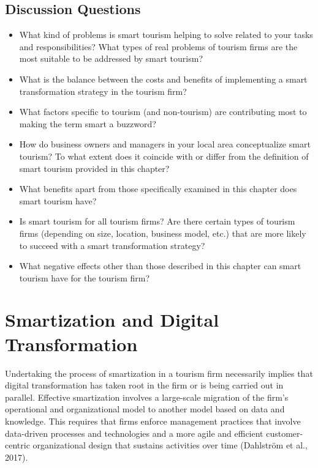 \documentclass[
  letterpaper,
  DIV=11,
  numbers=noendperiod]{scrreprt}
\begin{document}
\hypertarget{discussion-questions}{%
\section{Discussion Questions}\label{discussion-questions}}

\begin{itemize}
\item
  What kind of problems is smart tourism helping to solve related to
  your tasks and responsibilities? What types of real problems of
  tourism firms are the most suitable to be addressed by smart tourism?
\item
  What is the balance between the costs and benefits of implementing a
  smart transformation strategy in the tourism firm?
\item
  What factors specific to tourism (and non-tourism) are contributing
  most to making the term smart a buzzword?
\item
  How do business owners and managers in your local area conceptualize
  smart tourism? To what extent does it coincide with or differ from the
  definition of smart tourism provided in this chapter?
\item
  What benefits apart from those specifically examined in this chapter
  does smart tourism have?
\item
  Is smart tourism for all tourism firms? Are there certain types of
  tourism firms (depending on size, location, business model, etc.) that
  are more likely to succeed with a smart transformation strategy?
\item
  What negative effects other than those described in this chapter can
  smart tourism have for the tourism firm?
\end{itemize}

\hypertarget{smartization-and-digital-transformation}{%
\chapter{Smartization and Digital
Transformation}\label{smartization-and-digital-transformation}}

Undertaking the process of smartization in a tourism firm necessarily
implies that digital transformation has taken root in the firm or is
being carried out in parallel. Effective smartization involves a
large-scale migration of the firm's operational and organizational model
to another model based on data and knowledge. This requires that firms
enforce management practices that involve data-driven processes and
technologies and a more agile and efficient customer-centric
organizational design that sustains activities over time (Dahlström et
al., 2017).
\end{document}
